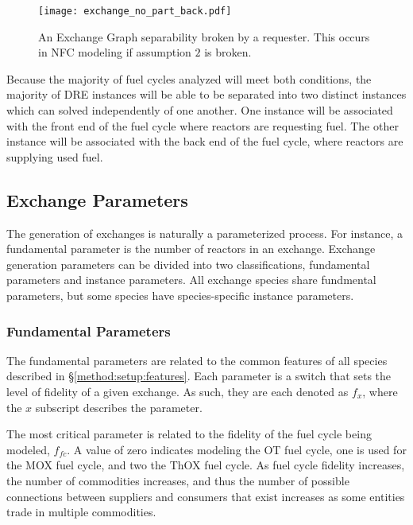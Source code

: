 \begin{figure}
  \begin{center}
    \texttt{[image: exchange\_no\_part\_back.pdf]}
    \caption[]{
      \label{fig:no_part_back}
      An Exchange Graph separability broken by a requester. This occurs in NFC
      modeling if assumption $2$ is broken.}
  \end{center}
\end{figure}

Because the majority of fuel cycles analyzed will meet both conditions, the
majority of DRE instances will be able to be separated into two distinct
instances which can solved independently of one another. One instance will be
associated with the front end of the fuel cycle where reactors are requesting
fuel. The other instance will be associated with the back end of the fuel cycle,
where reactors are supplying used fuel.

\subsection{Exchange Parameters}\label{method:setup:params}

The generation of exchanges is naturally a parameterized process. For instance,
a fundamental parameter is the number of reactors in an exchange. Exchange
generation parameters can be divided into two classifications, fundamental
parameters and instance parameters. All exchange species share fundmental
parameters, but some species have species-specific instance parameters.

\subsubsection{Fundamental Parameters}

The fundamental parameters are related to the common features of all species
described in \S \ref{method:setup:features}. Each parameter is a switch that
sets the level of fidelity of a given exchange. As such, they are each denoted
as $f_x$, where the $x$ subscript describes the parameter.

The most critical parameter is related to the fidelity of the fuel cycle being
modeled, $f_{fc}$. A value of zero indicates modeling the OT fuel cycle, one is
used for the MOX fuel cycle, and two the ThOX fuel cycle. As fuel cycle fidelity
increases, the number of commodities increases, and thus the number of possible
connections between suppliers and consumers that exist increases as some
entities trade in multiple commodities.

